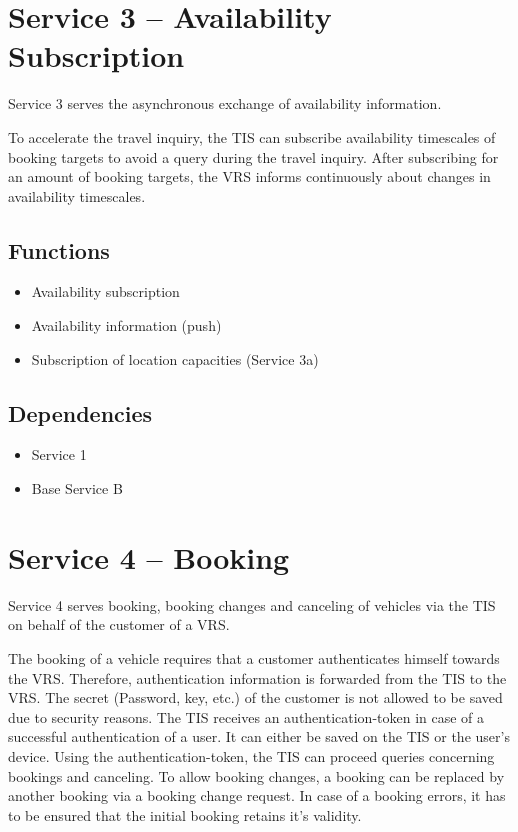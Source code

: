 \section{Service 3 -- Availability Subscription}
\label{sec:Hierachiemodell:Dienst3}
Service 3 serves the asynchronous exchange of availability information.

To accelerate the travel inquiry, the TIS can subscribe availability timescales of booking targets to avoid a query during the travel inquiry. After subscribing for an amount of booking targets, the VRS informs continuously about changes in availability timescales. 

\subsection*{Functions}
\begin{itemize}
\item Availability subscription
\item Availability information (push)
\item Subscription of location capacities (Service 3a)
\end{itemize}

\subsection*{Dependencies}
\begin{itemize}
\item Service 1
\item Base Service B
\end{itemize}


\section{Service 4 -- Booking}
\label{sec:Hierachiemodell:Dienst4}
Service 4 serves booking, booking changes and canceling of vehicles via the TIS on behalf of the customer of a VRS.

The booking of a vehicle requires that a customer authenticates himself towards the VRS. Therefore, authentication information is forwarded from the TIS to the VRS. The secret (Password, key, etc.) of the customer is not allowed to be saved due to security reasons. The TIS receives an authentication-token in case of a successful authentication of a user. It can either be saved on the TIS or the user's device. Using the authentication-token, the TIS can proceed queries concerning bookings and canceling. 
To allow booking changes, a booking can be replaced by another booking via a booking change request. In case of a booking errors, it has to be ensured that the initial booking retains it's validity. 

